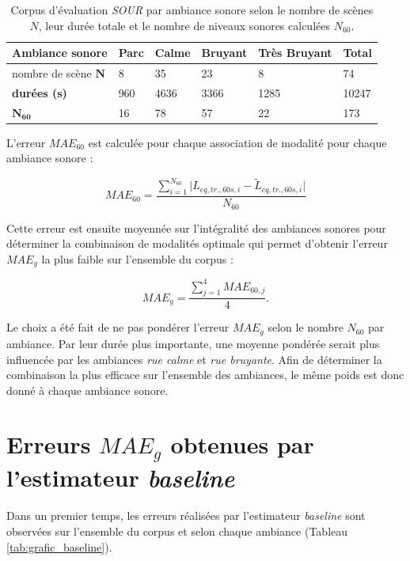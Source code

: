 \begin{table}[h!]
\caption{Corpus d'évaluation \textit{SOUR} par ambiance sonore selon le nombre de scènes $N$, leur durée totale et le nombre de niveaux sonores calculées $N_{60}$.}
\label{tab:resume_sour}
\centering
\begin{tabular}{L{3cm}C{2cm}C{2cm}C{2cm}C{2cm}C{2cm}}
\toprule
\textbf{Ambiance sonore} & \textbf{Parc} & \textbf{Calme} & \textbf{Bruyant} & \textbf{Très Bruyant} & \textbf{Total}\\ \midrule
nombre de scène $\mathbf{N}$ & 8 & 35 & 23 & 8 & 74 \\
\textbf{durées (s)} & 960 & 4636 & 3366 & 1285 & 10247 \\
$\mathbf{N_{60}}$ & 16 & 78 & 57 & 22 & 173 \\ \bottomrule
\end{tabular}
\end{table}

L'erreur $MAE_{60}$ est calculée pour chaque association de modalité pour chaque ambiance sonore : 

\begin{equation}
MAE_{60} = \frac{\sum_{i = 1}^{N_{60}}\vert L_{eq,tr.,60s, i} - \tilde{L}_{eq,tr.,60s, i}\vert}{N_{60}}
\end{equation}

Cette erreur est ensuite moyennée sur l'intégralité des ambiances sonores pour déterminer la combinaison de modalités optimale qui permet d'obtenir l'erreur $MAE_g$ la plus faible sur l'ensemble du corpus :
  
\begin{equation}
MAE_{g} = \frac{\sum_{j = 1}^4 MAE_{60,j}}{4}.
\end{equation}

Le choix a été fait de ne pas pondérer l'erreur $MAE_{g}$ selon le nombre $N_{60}$ par ambiance. Par leur durée plus importante, une moyenne pondérée serait plus influencée par les ambiances \textit{rue calme} et \textit{rue bruyante}. Afin de déterminer la combinaison la plus efficace sur l'ensemble des ambiances, le même poids est donc donné à chaque ambiance sonore.


\section{Erreurs $MAE_g$ obtenues par l'estimateur \textit{baseline}}
Dans un premier temps, les erreurs réalisées par l'estimateur \textit{baseline} sont observées sur l'ensemble du corpus et selon chaque ambiance (Tableau \ref{tab:grafic_baseline}).


